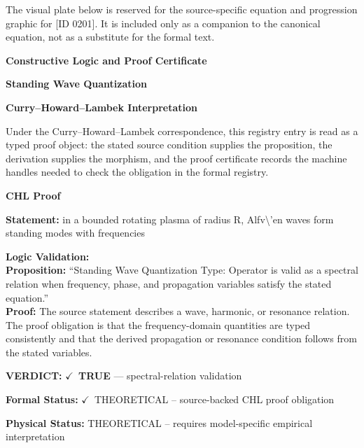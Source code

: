 \begingroup\footnotesize\sloppy
The visual plate below is reserved for the source-specific equation and progression graphic for [ID 0201]. It is included only as a companion to the canonical equation, not as a substitute for the formal text.
\par\endgroup
\ifTZPDarkEdition
{}
\fi

\clearpage
\begingroup\tzpsupportsetup
\noindent\textbf{\fontsize{10.8pt}{12.8pt}\selectfont [ID 0201] Constructive Logic and Proof Certificate}\par
\noindent\textbf{\fontsize{10pt}{12pt}\selectfont Standing Wave Quantization}\par
\vspace{0.45em}
\begingroup
\footnotesize
\setlength{\parskip}{0.22em}
\setlength{\parindent}{0pt}
\noindent\textbf{Curry--Howard--Lambek Interpretation}\par
Under the Curry--Howard--Lambek correspondence, this registry entry is read as a typed proof
object: the stated source condition supplies the proposition, the derivation supplies the
morphism, and the proof certificate records the machine handles needed to check the obligation
in the formal registry.

\vspace{0.45em}
\noindent\textbf{CHL Proof}\par
\textbf{Statement:} in a bounded rotating plasma of radius R, Alfv\textbackslash{}'en waves form standing modes with
frequencies

\textbf{Logic Validation:}\\
\textbf{Proposition:} ``Standing Wave Quantization Type: Operator is valid as a spectral relation when
frequency, phase, and propagation variables satisfy the stated equation.''\\
\textbf{Proof:} The source statement describes a wave, harmonic, or resonance relation. The proof
obligation is that the frequency-domain quantities are typed consistently and that the
derived propagation or resonance condition follows from the stated variables.

\textbf{VERDICT:} \ensuremath{\checkmark}\ \textbf{TRUE} --- spectral-relation validation

\textbf{Formal Status:} \ensuremath{\checkmark}\ THEORETICAL -- source-backed CHL proof obligation

\textbf{Physical Status:} THEORETICAL -- requires model-specific empirical interpretation
\par\vspace{0.45em}
\par
\ifTZPDarkEdition
{}
\fi
\endgroup
\endgroup
